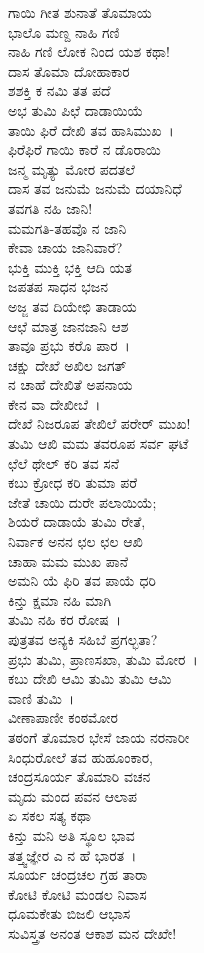 ಗಾಯಿ ಗೀತ ಶುನಾತೆ ತೊಮಾಯ\\ಭಾಲೊ ಮಣ್ದ ನಾಹಿ ಗಣಿ\\ನಾಹಿ ಗಣಿ ಲೋಕ ನಿಂದ ಯಶ ಕಥಾ!\\ದಾಸ ತೊಮಾ ದೋಹಾಕಾರ\\ಶಶಕ್ತಿ ಕ ನಮಿ ತತ ಪದೆ\\ಅಭ ತುಮಿ ಪಿಛೆ ದಾಡಾಯಿಯೆ\\ತಾಯಿ ಫಿರೆ ದೇಖಿ ತವ ಹಾಸಿಮುಖ~।\\ಫಿರೆಫಿರೆ ಗಾಯಿ ಕಾರೆ ನ ಡೊರಾಯಿ\\ಜನ್ಮ ಮೃತ್ಯು ಮೋರ ಪದತಲೆ\\ದಾಸ ತವ ಜನುಮೆ ಜನುಮೆ ದಯಾನಿಧೆ\\ತವಗತಿ ನಹಿ ಜಾನಿ!\\ಮಮಗತಿ-ತಹವೊ ನ ಜಾನಿ\\ಕೇವಾ ಚಾಯ ಜಾನಿವಾರೆ?\\ಭುಕ್ತಿ ಮುಕ್ತಿ ಭಕ್ತಿ ಆದಿ ಯತ\\ಜಪತಪ ಸಾಧನ ಭಜನ\\ಅಜ್ಜ ತವ ದಿಯೇಛಿ ತಾಡಾಯ\\ಆಛೆ ಮಾತ್ರ ಜಾನಜಾನಿ ಆಶ\\ತಾವೂ ಪ್ರಭು ಕರೊ ಪಾರ~।\\ಚಕ್ಷು ದೇಖೆ ಅಖಿಲ ಜಗತ್\\ನ ಚಾಹೆ ದೇಖಿತೆ ಅಪನಾಯ\\ಕೇನ ವಾ ದೇಖೀಬೆ~।\\ದೇಖೆ ನಿಜರೂಪ ತೇಖಿಲೆ ಪರೇರ್ ಮುಖ!\\ತುಮಿ ಆಖಿ ಮಮ ತವರೂಪ ಸರ್ವ ಘಟೆ\\ಛೆಲೆ ಥೇಲ್ ಕರಿ ತವ ಸನೆ\\ಕಬು ಕ್ರೋಧ ಕರಿ ತುಮಾ ಪರೆ\\ಜೇತೆ ಚಾಯಿ ದುರೇ ಪಲಾಯಿಯೆ;\\ಶಿಯರೆ ದಾಡಾಯೆ ತುಮಿ ರೇತೆ,\\ನಿರ್ವಾಕ ಅನನ ಛಲ ಛಲ ಆಖಿ\\ಚಾಹಾ ಮಮ ಮುಖ ಪಾನೆ\\ಅಮನಿ ಯೆ ಫಿರಿ ತವ ಪಾಯೆ ಧರಿ\\ಕಿನ್ತು ಕ್ಷಮಾ ನಹಿ ಮಾಗಿ\\ತುಮಿ ನಹಿ ಕರ ರೋಷ~।\\ಪುತ್ರತವ ಅನ್ಯಕಿ ಸಹಿಬೆ ಪ್ರಗಲ್ಭತಾ?\\ಪ್ರಭು ತುಮಿ, ಪ್ರಾಣಸಖಾ, ತುಮಿ ಮೋರ~।\\ಕಬು ದೇಖಿ ಆಮಿ ತುಮಿ ತುಮಿ ಆಮಿ\\ವಾಣಿ ತುಮಿ~।\\ವೀಣಾಪಾಣೀ ಕಂಠಮೋರ\\ತಠಂಗೆ ತೊಮಾರ ಭೇಸೆ ಜಾಯ ನರನಾರೀ\\ಸಿಂಧುರೋಲೆ ತವ ಹುಹೂಂಕಾರ,\\ಚಂದ್ರಸೂರ್ಯ ತೊಮಾರಿ ವಚನ\\ಮೃದು ಮಂದ ಪವನ ಆಲಾಪ\\ಏ ಸಕಲ ಸತ್ಯ ಕಥಾ\\ಕಿನ್ತು ಮನಿ ಅತಿ ಸ್ಥೂಲ ಭಾವ\\ತತ್ತ್ವಜ್ಞೇರ ಎ ನ ಹೆ ಭಾರತ~।\\ಸೂರ್ಯ ಚಂದ್ರಚಲ ಗ್ರಹ ತಾರಾ\\ಕೋಟಿ ಕೋಟಿ ಮಂಡಲ ನಿವಾಸ\\ಧೂಮಕೇತು ಬಿಜಲಿ ಆಭಾಸ\\ಸುವಿಸ್ತ್ರತ ಅನಂತ ಆಕಾಶ ಮನ ದೇಖೇ!\\
